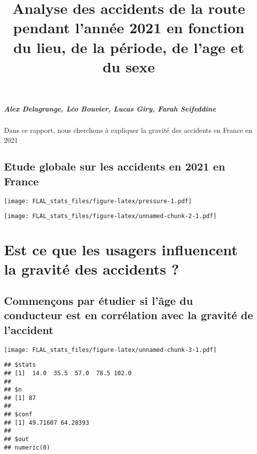 \documentclass[
]{article}
\title{Analyse des accidents de la route pendant l'année 2021 en
fonction du lieu, de la période, de l'age et du sexe}
\author{}
\date{\vspace{-2.5em}}
\begin{document}
\maketitle

{
\setcounter{tocdepth}{2}
\tableofcontents
}
\hypertarget{alex-delagrange-luxe9o-bouvier-lucas-giry-farah-seifeddine}{%
\subparagraph{Alex Delagrange, Léo Bouvier, Lucas Giry, Farah
Seifeddine}\label{alex-delagrange-luxe9o-bouvier-lucas-giry-farah-seifeddine}}

Dans ce rapport, nous cherchons à expliquer la gravité des accidents en
France en 2021

\hypertarget{etude-globale-sur-les-accidents-en-2021-en-france}{%
\subsection{Etude globale sur les accidents en 2021 en
France}\label{etude-globale-sur-les-accidents-en-2021-en-france}}

\texttt{[image: FLAL\_stats\_files/figure-latex/pressure-1.pdf]}

\texttt{[image: FLAL\_stats\_files/figure-latex/unnamed-chunk-2-1.pdf]}

\hypertarget{est-ce-que-les-usagers-influencent-la-gravituxe9-des-accidents}{%
\section{Est ce que les usagers influencent la gravité des accidents
?}\label{est-ce-que-les-usagers-influencent-la-gravituxe9-des-accidents}}

\hypertarget{commenuxe7ons-par-uxe9tudier-si-luxe2ge-du-conducteur-est-en-corruxe9lation-avec-la-gravituxe9-de-laccident}{%
\subsection{Commençons par étudier si l'âge du conducteur est en
corrélation avec la gravité de
l'accident}\label{commenuxe7ons-par-uxe9tudier-si-luxe2ge-du-conducteur-est-en-corruxe9lation-avec-la-gravituxe9-de-laccident}}

\texttt{[image: FLAL\_stats\_files/figure-latex/unnamed-chunk-3-1.pdf]}

\begin{verbatim}
## $stats
## [1]  14.0  35.5  57.0  78.5 102.0
## 
## $n
## [1] 87
## 
## $conf
## [1] 49.71607 64.28393
## 
## $out
## numeric(0)
\end{verbatim}
\end{document}
